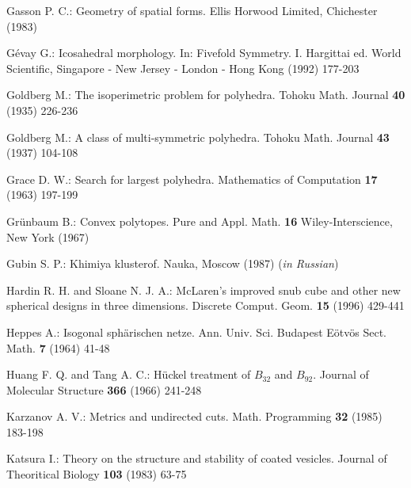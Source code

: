\begin{thebibliography}{99}
Gasson P. C.:
Geometry of spatial forms.
Ellis Horwood Limited, Chichester (1983)
\vspace{-3mm}

G\'evay G.:
Icosahedral morphology.
In: Fivefold Symmetry. I. Hargittai ed. World Scientific,
Singapore - New Jersey - London - Hong Kong (1992) 177-203
\vspace{-3mm}

Goldberg M.:
The isoperimetric problem for polyhedra.
Tohoku Math. Journal {\bf 40} (1935) 226-236
\vspace{-3mm}

Goldberg M.:
A class of multi-symmetric polyhedra.
Tohoku Math. Journal {\bf 43} (1937) 104-108
\vspace{-3mm}

Grace D. W.:
Search for largest polyhedra.
Mathematics of Computation {\bf 17} (1963) 197-199
\vspace{-3mm}

Gr\"unbaum B.:
Convex polytopes.
Pure and Appl. Math. {\bf 16} Wiley-Interscience, New York (1967)
\vspace{-3mm}

Gubin S. P.:
Khimiya klusterof.
Nauka, Moscow (1987) ({\it in Russian})
\vspace{-3mm}

Hardin R. H. and Sloane N. J. A.:
McLaren's improved snub cube and other new spherical designs in three
dimensions.
Discrete Comput. Geom. {\bf 15} (1996) 429-441
\vspace{-3mm}

Heppes A.:
Isogonal sph\"arischen netze.
Ann. Univ. Sci. Budapest E\"otv\"os
Sect. Math. {\bf 7} (1964) 41-48 
\vspace{-3mm}
 
Huang F. Q. and Tang A. C.:
H\"uckel treatment of $B_{32}$ and $B_{92}$.
Journal of Molecular Structure  {\bf 366} (1966) 241-248
\vspace{-3mm}

Karzanov A. V.:
Metrics and undirected cuts.
Math. Programming {\bf 32} (1985) 183-198
\vspace{-3mm}

Katsura I.:
Theory on the structure and stability of coated vesicles.
Journal of Theoritical Biology {\bf 103} (1983) 63-75
\vspace{-3mm}


\end{thebibliography}

